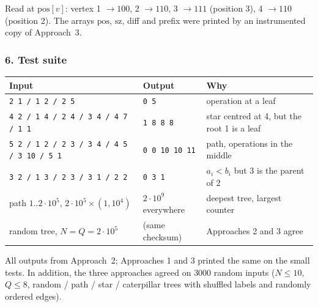 \begin{tracebox}
\begin{center}
\end{center}
Read at $\mathrm{pos}[v]$: vertex 1 $\to 100$, 2 $\to 110$, 3 $\to 111$ (position 3), 4 $\to 110$ (position 2). The arrays $\mathrm{pos}$, $\mathrm{sz}$, diff and prefix were printed by an instrumented copy of Approach~3.
\end{tracebox}

\subsubsection*{6. Test suite}

\begin{testbox}
\centering\small
\begin{tabular}{@{}p{5.4cm}p{3.2cm}p{4.8cm}@{}}
\toprule
\textbf{Input} & \textbf{Output} & \textbf{Why} \\
\midrule
\texttt{2 1 / 1 2 / 2 5} & \texttt{0 5} & operation at a leaf \\
\texttt{4 2 / 1 4 / 2 4 / 3 4 / 4 7 / 1 1} & \texttt{1 8 8 8} & star centred at 4, but the root 1 is a leaf \\
\texttt{5 2 / 1 2 / 2 3 / 3 4 / 4 5 / 3 10 / 5 1} & \texttt{0 0 10 10 11} & path, operations in the middle \\
\texttt{3 2 / 1 3 / 2 3 / 3 1 / 2 2} & \texttt{0 3 1} & $a_i < b_i$ but 3 is the parent of 2 \\
path $1..2\cdot10^5$, $2\cdot10^5 \times (1, 10^4)$ & $2\cdot10^9$ everywhere & deepest tree, largest counter \\
random tree, $N = Q = 2\cdot10^5$ & (same checksum) & Approaches 2 and 3 agree \\
\bottomrule
\end{tabular}
\end{testbox}
All outputs from Approach~2; Approaches 1 and 3 printed the same on the small tests. In addition, the three approaches agreed on $3000$ random inputs ($N \le 10$, $Q \le 8$, random / path / star / caterpillar trees with shuffled labels and randomly ordered edges).

